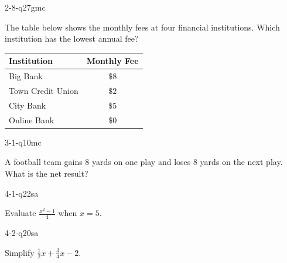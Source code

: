 \begin{practiceQuestion}{2-8-q27}{gmc}
\begin{questionText}
The table below shows the monthly fees at four financial institutions. Which institution has the lowest annual fee?

\begin{center}
\begin{tabular}{|l|c|}
\hline
\textbf{Institution} & \textbf{Monthly Fee} \\
\hline
Big Bank & $\$8$ \\
\hline
Town Credit Union & $\$2$ \\
\hline
City Bank & $\$5$ \\
\hline
Online Bank & $\$0$ \\
\hline
\end{tabular}
\end{center}
\end{questionText}
\end{practiceQuestion}

\begin{practiceQuestion}{3-1-q10}{mc}
\begin{questionText}
A football team gains $8$ yards on one play and loses $8$ yards on the next play. What is the net result?
\end{questionText}
\end{practiceQuestion}

\begin{practiceQuestion}{4-1-q22}{sa}
\begin{questionText}
Evaluate $\frac{x^2 - 1}{4}$ when $x = 5$.
\end{questionText}
\end{practiceQuestion}

\begin{practiceQuestion}{4-2-q20}{sa}
\begin{questionText}
Simplify $\frac{1}{2}x + \frac{3}{4}x - 2$.


\begin{center}
\hspace{1cm}
\end{center}
\end{questionText}
\end{practiceQuestion}

